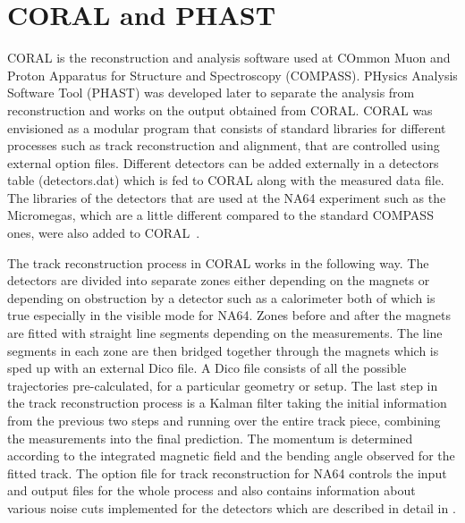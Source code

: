 \section{CORAL and PHAST}
CORAL is the reconstruction and analysis software used at COmmon Muon and Proton Apparatus for Structure and Spectroscopy (COMPASS). PHysics Analysis Software Tool (PHAST) was developed later to separate the analysis from reconstruction and works on the output obtained from CORAL. CORAL was envisioned as a modular program that consists of standard libraries for different processes such as track reconstruction and alignment, that are controlled using external option files. Different detectors can be added externally in a detectors table (detectors.dat) which is fed to CORAL along with the measured data file. The libraries of the detectors that are used at the NA64 experiment such as the Micromegas, which are a little different compared to the standard COMPASS ones, were also added to CORAL~\cite{hosgen:2017}.

The track reconstruction process in CORAL works in the following way. The detectors are divided into separate zones either depending on the magnets or depending on obstruction by a detector such as a calorimeter both of which is true especially in the visible mode for NA64. Zones before and after the magnets are fitted with straight line segments depending on the measurements. The line segments in each zone are then bridged together through the magnets which is sped up with an external Dico file. A Dico file consists of all the possible trajectories pre-calculated, for a particular geometry or setup. The last step in the track reconstruction process is a Kalman filter taking the initial information from the previous two steps and running over the entire track piece, combining the measurements into the final prediction. The momentum is determined according to the integrated magnetic field and the bending angle observed for the fitted track. The option file for track reconstruction for NA64 controls the input and output files for the whole process and also contains information about various noise cuts implemented for the detectors which are described in detail in \cite{hosgen:2017}.



